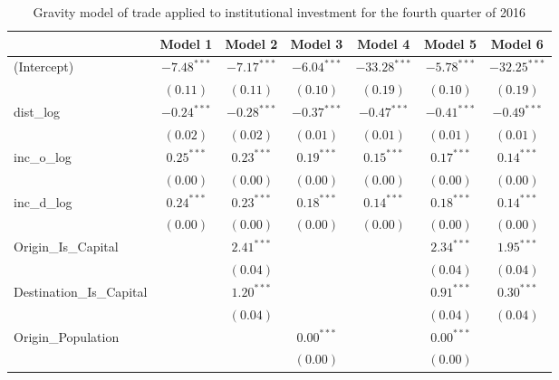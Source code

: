 \begin{table}
	\begin{center}
		\small
		\caption[Gravity Model of Trade for Q4 2016]{Gravity model of trade applied to institutional investment for the fourth quarter of 2016}
		\begin{tabular}{l c c c c c c }
			\hline
			& Model 1 & Model 2 & Model 3 & Model 4 & Model 5 & Model 6 \\
			\hline
			(Intercept)                  & $-7.48^{***}$ & $-7.17^{***}$ & $-6.04^{***}$ & $-33.28^{***}$ & $-5.78^{***}$ & $-32.25^{***}$ \\
			& $(0.11)$      & $(0.11)$      & $(0.10)$      & $(0.19)$       & $(0.10)$      & $(0.19)$       \\
			dist\_log                    & $-0.24^{***}$ & $-0.28^{***}$ & $-0.37^{***}$ & $-0.47^{***}$  & $-0.41^{***}$ & $-0.49^{***}$  \\
			& $(0.02)$      & $(0.02)$      & $(0.01)$      & $(0.01)$       & $(0.01)$      & $(0.01)$       \\
			inc\_o\_log                  & $0.25^{***}$  & $0.23^{***}$  & $0.19^{***}$  & $0.15^{***}$   & $0.17^{***}$  & $0.14^{***}$   \\
			& $(0.00)$      & $(0.00)$      & $(0.00)$      & $(0.00)$       & $(0.00)$      & $(0.00)$       \\
			inc\_d\_log                  & $0.24^{***}$  & $0.23^{***}$  & $0.18^{***}$  & $0.14^{***}$   & $0.18^{***}$  & $0.14^{***}$   \\
			& $(0.00)$      & $(0.00)$      & $(0.00)$      & $(0.00)$       & $(0.00)$      & $(0.00)$       \\
			Origin\_Is\_Capital          &               & $2.41^{***}$  &               &                & $2.34^{***}$  & $1.95^{***}$   \\
			&               & $(0.04)$      &               &                & $(0.04)$      & $(0.04)$       \\
			Destination\_Is\_Capital     &               & $1.20^{***}$  &               &                & $0.91^{***}$  & $0.30^{***}$   \\
			&               & $(0.04)$      &               &                & $(0.04)$      & $(0.04)$       \\
			Origin\_Population           &               &               & $0.00^{***}$  &                & $0.00^{***}$  &                \\
			&               &               & $(0.00)$      &                & $(0.00)$      &                \\

\end{tabular}
\end{center}
\end{table}
